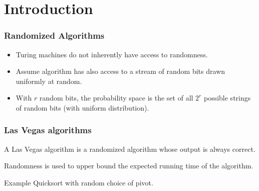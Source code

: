 
%
%

\newcommand{\mcF}{\mathcal{F}}
\newcommand{\bs}{\backslash}
\newcommand{\phisub}{\textsc{$\Phi$-Sub\-set}\xspace}
\newcommand{\phiext}{\textsc{$\Phi$-Ex\-ten\-sion}\xspace}




\section{Introduction} 

\begin{frame}[c]\frametitle{Randomized Algorithms}


    \begin{itemize}
        \item Turing machines do not inherently have access to randomness.
        \item Assume algorithm has also access to a stream of \alert{random bits} drawn uniformly at random.
        \item With $r$ random bits, the probability space is the set of all $2^r$ possible strings of random bits (with uniform distribution).
    \end{itemize}
    

\end{frame}

\begin{frame}\frametitle{Las Vegas algorithms}
    \begin{definition}
		A \alert{Las Vegas algorithm} is a randomized algorithm whose output is always correct.
	\end{definition}

	\noindent
	Randomness is used to upper bound the expected running time of the algorithm.
	
	\begin{block}{Example}
		Quicksort with random choice of pivot.
	\end{block}
\end{frame}


